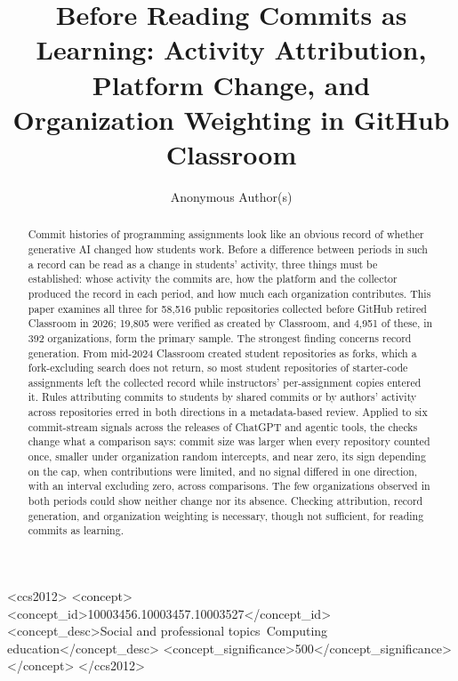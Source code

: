 \documentclass[acmsmall,screen,review,anonymous]{acmart}
\begin{document}
\title[Before Reading Commits as Learning]{Before Reading Commits as Learning: Activity Attribution, Platform Change, and Organization Weighting in GitHub Classroom}

\author{Anonymous Author(s)}

\begin{abstract}
Commit histories of programming assignments look like an obvious record of whether generative AI changed how students work. Before a difference between periods in such a record can be read as a change in students' activity, three things must be established: whose activity the commits are, how the platform and the collector produced the record in each period, and how much each organization contributes. This paper examines all three for 58,516 public repositories collected before GitHub retired Classroom in 2026; 19,805 were verified as created by Classroom, and 4,951 of these, in 392 organizations, form the primary sample. The strongest finding concerns record generation. From mid-2024 Classroom created student repositories as forks, which a fork-excluding search does not return, so most student repositories of starter-code assignments left the collected record while instructors' per-assignment copies entered it. Rules attributing commits to students by shared commits or by authors' activity across repositories erred in both directions in a metadata-based review. Applied to six commit-stream signals across the releases of ChatGPT and agentic tools, the checks change what a comparison says: commit size was larger when every repository counted once, smaller under organization random intercepts, and near zero, its sign depending on the cap, when contributions were limited, and no signal differed in one direction, with an interval excluding zero, across comparisons. The few organizations observed in both periods could show neither change nor its absence. Checking attribution, record generation, and organization weighting is necessary, though not sufficient, for reading commits as learning.
\end{abstract}

\begin{CCSXML}
<ccs2012>
<concept>
<concept_id>10003456.10003457.10003527</concept_id>
<concept_desc>Social and professional topics~Computing education</concept_desc>
<concept_significance>500</concept_significance>
</concept>
</ccs2012>
\end{CCSXML}
\end{document}
